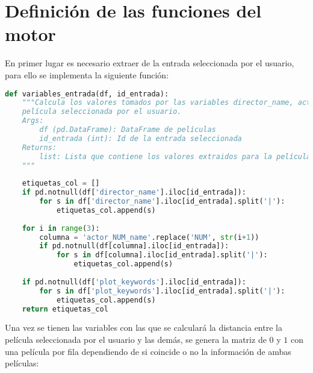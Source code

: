\section{Definición de las funciones del motor}

En primer lugar es necesario extraer de la entrada seleccionada por el usuario, para ello se implementa la siguiente función:
\begin{lstlisting}[language=Python, caption= {Variables utilizadas para la creación de la matriz de coordenadas.}, label= {lst:variablesfila}]
def variables_entrada(df, id_entrada): 
    """Calcula los valores tomados por las variables director_name, actor_[1,2,3]_name y plot_keywords para la
    película seleccionada por el usuario.
    Args:
        df (pd.DataFrame): DataFrame de películas
        id_entrada (int): Id de la entrada seleccionada
    Returns:
        list: Lista que contiene los valores extraidos para la película seleccionada
    """
    
    etiquetas_col = []    
    if pd.notnull(df['director_name'].iloc[id_entrada]):
        for s in df['director_name'].iloc[id_entrada].split('|'):
            etiquetas_col.append(s)
            
    for i in range(3):
        columna = 'actor_NUM_name'.replace('NUM', str(i+1))
        if pd.notnull(df[columna].iloc[id_entrada]):
            for s in df[columna].iloc[id_entrada].split('|'):
                etiquetas_col.append(s)
                
    if pd.notnull(df['plot_keywords'].iloc[id_entrada]):
        for s in df['plot_keywords'].iloc[id_entrada].split('|'):
            etiquetas_col.append(s)
    return etiquetas_col
\end{lstlisting}

Una vez se tienen las variables con las que se calculará la distancia entre la película seleccionada por el usuario y las demás, se genera la matriz de $0$ y $1$ con una película por fila dependiendo de si coincide o no la información de ambas películas:

